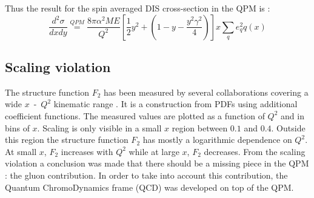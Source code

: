 Thus the result for the spin averaged DIS cross-section in the QPM is \cite{BERGER} :
%
\begin{equation}
  \frac{d^2\sigma}{dxdy} \stackrel{QPM}{=} \frac{8\pi\alpha^2ME}{Q^2}\left[\frac{1}{2}y^2+\left(1-y-\frac{y^2\gamma^2}{4}\right)\right]x\sum\limits_{q}e^2_qq(x)
\end{equation}

\subsection{Scaling violation}

The structure function $F_2$ has been measured by several collaborations covering a wide $x$~-~$Q^2$ kinematic range \cite{PDG}. It is a construction from PDFs using additional coefficient functions. The measured values are plotted as a function of $Q^2$ and in bins of $x$. Scaling is only visible in a small $x$ region between $0.1$ and $0.4$. Outside this region the structure function $F_2$ has mostly a logarithmic dependence on $Q^2$. At small $x$, $F_2$ increases with $Q^2$ while at large $x$, $F_2$ decreases. From the scaling violation a conclusion was made that there should be a missing piece in the QPM : the gluon contribution. In order to take into account this contribution, the Quantum ChromoDynamics frame (QCD) was developed on top of the QPM.

